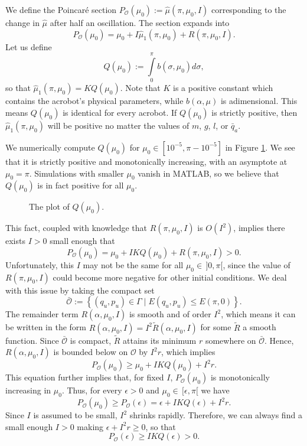 We define the Poincar\'{e} section 
\(P_\mathcal{O}(\mu_0) := \hat{\mu}(\pi,\mu_0,I)\)
corresponding to the change in \(\hat{\mu}\) after half an oscillation.
The section expands into
\[
    P_\mathcal{O}(\mu_0) = \mu_0 + I \hat{\mu}_1(\pi,\mu_0) + R(\pi,\mu_0,I)
    .
\]
Let us define
\[
    Q(\mu_0) := \int \limits_0^\pi b(\sigma,\mu_0)d\sigma
    ,
\]
so that \(\hat{\mu}_1(\pi,\mu_0) = K Q(\mu_0)\).
Note that \(K\) is a positive constant which contains the acrobot's physical
parameters, while \(b(\alpha,\mu)\) is adimensional. 
This means \(Q(\mu_0)\) is identical for every acrobot.
If \(Q(\mu_0)\) is strictly positive, then \(\hat{\mu}_1(\pi,\mu_0)\) will be
positive no matter the values of \(m\), \(g\), \(l\), or \(\bar{q}_a\).

We numerically compute \(Q(\mu_0)\) for \(\mu_0 \in [10^{-5}, \pi - 10^{-5}]\)
in Figure \ref{fig:acrobot-Q}. 
We see that it is strictly positive and monotonically increasing, with
an asymptote at \(\mu_0 = \pi\). 
Simulations with smaller \(\mu_0\) vanish in MATLAB, so we believe that 
\(Q(\mu_0)\) is in fact positive for all \(\mu_0\).

\begin{figure}
    \centering
    \caption{The plot of \(Q(\mu_0)\).}
    \label{fig:acrobot-Q}
\end{figure}

This fact, coupled with knowledge that \(R(\pi,\mu_0,I)\) is \(O(I^2)\), 
implies there exists \(I > 0\) small enough that
\[
    P_\mathcal{O}(\mu_0) = \mu_0 + IKQ(\mu_0) + R(\pi,\mu_0,I) > 0
    .
\]
Unfortunately, this \(I\) may not be the
same for all \(\mu_0 \in \, ]0,\pi[\), since
the value of \(R(\pi,\mu_0,I)\) could become more negative
for other initial conditions.
We deal with this issue by taking the compact set
\[
    \bar{\mathcal{O}} := \left\{(q_u,p_u) \in \Gamma 
    \mid E(q_u,p_u) \leq E(\pi,0) \right\}
    .
\]
The remainder term \(R(\alpha,\mu_0,I)\) is smooth and of order \(I^2\),
which means it can be written in the form 
\(R(\alpha,\mu_0,I) = I^2\tilde{R}(\alpha,\mu_0,I)\)
for some \(\tilde{R}\) a smooth function.
Since \(\bar{\mathcal{O}}\) is compact, \(\tilde{R}\) attains its minimum
\({r}\) somewhere on \(\bar{\mathcal{O}}\).
Hence, \(R(\alpha,\mu_0,I)\) is bounded below on \(\mathcal{O}\) by
\(I^2{r}\), which implies 
\begin{equation}\label{eqn:acrobot-Po-lowerbound}
    P_\mathcal{O}(\mu_0) \geq \mu_0 + IKQ(\mu_0) + I^2{r}
    .
\end{equation}
This equation further implies that, for fixed \(I\),
\(P_\mathcal{O}(\mu_0)\) is monotonically increasing in \(\mu_0\).
Thus, for every \(\epsilon > 0\) and \(\mu_0 \in \, [\epsilon,\pi[\) we have
\[
    P_\mathcal{O}(\mu_0) \geq P_\mathcal{O}(\epsilon)
    = \epsilon + IKQ(\epsilon) + I^2{r}
    .
\]
Since \(I\) is assumed to be small, \(I^2\) shrinks rapidly.
Therefore, we can always find a small enough \(I > 0\) making 
\(\epsilon + I^2{r} \geq 0\), so that
\[
    P_\mathcal{O}(\epsilon) \geq IKQ(\epsilon) > 0
    .
\]

